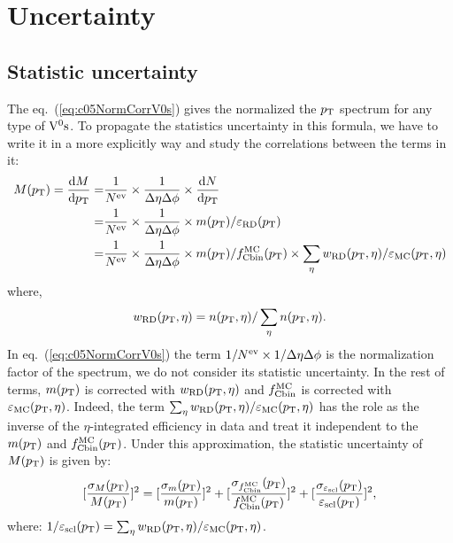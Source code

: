 \section{Uncertainty}

\subsection{Statistic uncertainty}
\label{sec:c06StatErrors}

The eq.~(\ref{eq:c05NormCorrV0s}) gives the normalized the $p_{\rm T}$ spectrum for
any type of ${\rm V}^{0}{\rm s}$.
To propagate the statistics uncertainty in this formula,
we have to write it in a more explicitly way and study the correlations
between the terms in it:
\begin{equation}\label{eq:c06NormCorrV0s}
\begin{split}
M(p_{\rm T})=
\frac{{\rm d}M}{{\rm d}p_{\rm T}} = &
\frac{1}{N^{\rm ev}}\times\frac{1}{\Delta\eta\Delta\phi}\times
\frac{{\rm d}N}{{\rm d}p_{\rm T}} \\
= &
\frac{1}{N^{\rm ev}}\times\frac{1}{\Delta\eta\Delta\phi}\times
m(p_{\rm T})/\varepsilon_{\rm RD}(p_{\rm T}) \\
= &
\frac{1}{N^{\rm ev}}\times\frac{1}{\Delta\eta\Delta\phi}\times
m(p_{\rm T})/f_{\rm Cbin}^{\rm MC}(p_{\rm T})\times
\sum_{\eta}w_{\rm RD}(p_{\rm T},\eta)/\varepsilon_{\rm MC}(p_{\rm T},\eta)
\end{split}
\end{equation}
where,
\begin{equation}\label{eq:c06CandiFracRD}
w_{\rm RD}(p_{\rm T},\eta)=n(p_{\rm T},\eta)/\sum_{\eta}n(p_{\rm T},\eta).
\end{equation}
In eq.~(\ref{eq:c05NormCorrV0s}) the term
$1/N^{\rm ev}\times 1/\Delta\eta\Delta\phi$ is the normalization factor of
the spectrum, we do not consider its statistic uncertainty.
In the rest of terms, $m(p_{\rm T})$ is corrected with $w_{\rm RD}(p_{\rm T},\eta)$ and
$f_{\rm Cbin}^{\rm MC}$ is corrected with $\varepsilon_{\rm MC}(p_{\rm T},\eta)$.
Indeed, the term
$\sum_{\eta}w_{\rm RD}(p_{\rm T},\eta)/\varepsilon_{\rm MC}(p_{\rm T},\eta)$
has the role as the inverse of the $\eta$-integrated efficiency in data and
treat it independent to the $m(p_{\rm T})$ and $f_{\rm Cbin}^{\rm MC}(p_{\rm T})$.
Under this approximation,
the statistic uncertainty of $M(p_{\rm T})$ is given by:
\begin{equation}\label{eq:c06StatErr}
[\frac{\sigma_{M}(p_{\rm T})}{M(p_{\rm T})}]^{2}=
[\frac{\sigma_{m}(p_{\rm T})}{m(p_{\rm T})}]^{2}+
[\frac{\sigma_{f_{\rm Cbin}^{\rm MC}}(p_{\rm T})}{f_{\rm Cbin}^{\rm MC}(p_{\rm T})}]^{2}+
[\frac{\sigma_{\varepsilon_{\rm scl}}(p_{\rm T})}{\varepsilon_{\rm scl}(p_{\rm T})}]^{2},
\end{equation}
where: $1/\varepsilon_{\rm scl}(p_{\rm T})=
          \sum_{\eta}w_{\rm RD}(p_{\rm T},\eta)/\varepsilon_{\rm MC}(p_{\rm T},\eta)$.

